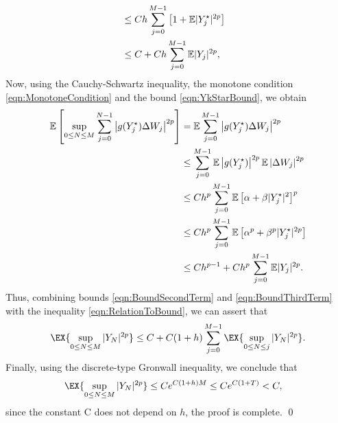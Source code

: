 \begin{pf}
\begin{align}
			\notag\\
		&\leq
			C h 
			\sum_{j=0}^{M-1}
			\left[
				1+\mathbb{E}|Y_j^{\star}|^{2p}
			\right]
			\notag\\
		&\leq
			C 
			+ 
			C h 
			\sum_{j=0}^{M-1}
				\mathbb{E}|Y_j|^{2p},				
	\end{align}
	 Now, using the Cauchy-Schwartz inequality, the monotone condition 
	\eqref{eqn:MonotoneCondition} and the bound \eqref{eqn:YkStarBound}, we obtain
	\begin{align}
	\mathbb{E}\left[
		\sup_{0\leq N \leq M}
			\sum_{j=0}^{N-1}
			\left|
				g(Y_j^{\star})\Delta W_j
			\right|^{2p}	
		\right]
		&=
			\mathbb{E}\sum_{j=0}^{M-1}
					\left|
						g(Y_j^{\star})\Delta W_j
					\right|^{2p}
			\notag\\
		&\leq	
			\sum_{j=0}^{M-1}
				\mathbb{E}\left|
						g(Y_j^{\star})
					\right|^{2p}
				\mathbb{E}\left|
						\Delta W_j
					\right|^{2p}
			\notag \\
		&\leq
			C h^p
			\sum_{j=0}^{M-1}
			\mathbb{E}\left[
					\alpha +\beta|Y^{\star}_j|^2
				\right]^p
			\notag\\
		&\leq
			Ch^p
			\sum_{j=0}^{M-1}
			\mathbb{E}\left[
					\alpha ^p +\beta^p |Y^{\star}_j|^{2p}
				\right]
			\notag\\
		&\leq
		Ch^{p-1}
		+
		Ch^p \sum_{j=0}^{M-1}
			\mathbb{E}|Y_j|^{2p} \label{eqn:BoundThirdTerm}.
	\end{align}
	Thus, combining bounds \eqref{eqn:BoundSecondTerm} and \eqref{eqn:BoundThirdTerm} with the inequality 
	\eqref{eqn:RelationToBound}, we can assert that
	\begin{align}
		\EX{
			\sup_{0\leq N \leq M}
					|Y_N|^{2p} 
		}
		\leq	
			C +C(1+h) 
			\sum_{j=0}^{M-1}
				\EX{
					\sup_{0\leq N \leq j}
					|Y_N|^{2p}
				}	
		.
	\end{align}
	Finally, using the discrete-type Gronwall inequality, we conclude that
	\begin{align*}
		\EX{
			\sup_{0\leq N \leq M}
			|Y_N|^{2p} 
		}	
		&\leq
			C e^{C(1+h)M} 
		\leq 
		C e^{C(1+T)}<C,
	\end{align*}
	since the constant C does not depend on $h$, the proof is complete. \qed
\end{pf}
	
